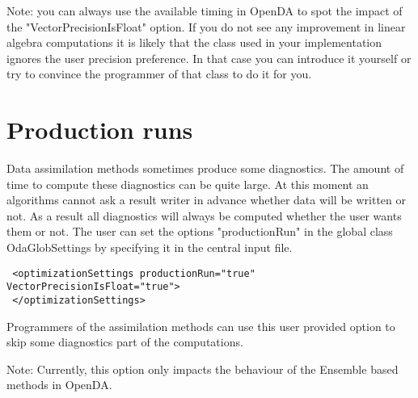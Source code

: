 Note: you can always use the available timing in OpenDA to spot the impact of the "VectorPrecisionIsFloat" option. If you do not see any improvement in linear algebra computations it is likely that the class used in your implementation ignores the user precision preference. In that case you can introduce it yourself or try to convince the programmer of that class to do it for you.

\section{Production runs}
Data assimilation methods sometimes produce some diagnostics. The amount of time to compute these diagnostics can be quite large. At this moment an algorithms cannot ask a result writer in advance whether data will be written or not. As a result all diagnostics will always be computed whether the user wants them or not. The user can set the options "productionRun" in the global class OdaGlobSettings by specifying it in the central input file.

{\footnotesize
\begin{verbatim}
 <optimizationSettings productionRun="true" VectorPrecisionIsFloat="true">
 </optimizationSettings>
\end{verbatim}}  
Programmers of the assimilation methods can use this user provided option to skip some diagnostics part of the computations.

Note: Currently, this option only impacts the behaviour of the Ensemble based methods in OpenDA.
 





